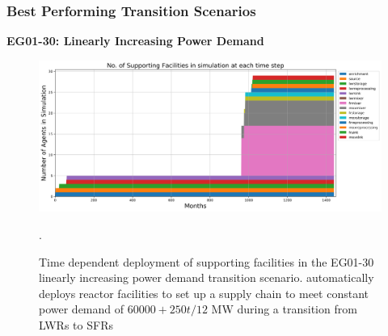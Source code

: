 \begin{frame}
\frametitle{Best Performing Transition Scenarios}
\textbf{EG01-30: Linearly Increasing Power Demand}
\begin{figure}[htbp!]
\begin{center}
\includegraphics[width=\textwidth]{images/eg30-stack_support.png}
\end{center}
\caption{Time dependent deployment of supporting facilities in 
the EG01-30 linearly increasing power demand transition scenario. 
\deploy automatically deploys reactor facilities 
to set up a supply chain to meet constant power demand of $60000+250t/12$ MW
during a transition from \glspl{LWR} to \glspl{SFR}}.
\end{figure}
\end{frame}

